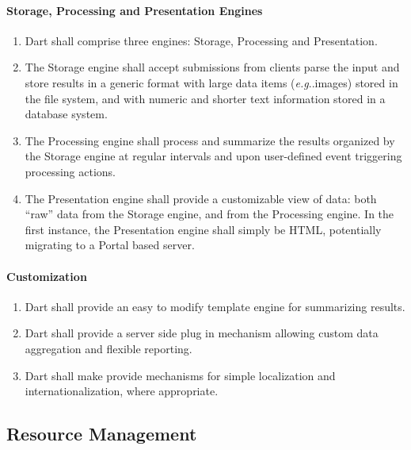 \documentclass{InsightBook}
\makeatletter
\DeclareRobustCommand\onedot{\futurelet\@let@token\@onedot}
\def\@onedot{\ifx\@let@token.\else.\xspace\fi}
\def\eg{\emph{e.g}\onedot} \def\Eg{\emph{E.g}\onedot}
\makeatother
\begin{document}
\paragraph{Storage, Processing and Presentation Engines}
\begin{enumerate}
\item Dart shall comprise three engines: Storage, Processing and
Presentation.
\item The Storage engine shall accept submissions from clients parse
the input and store results in a generic format with large data items
(\eg images)
stored in the file system, and with numeric and
shorter text information stored in a database system.
\item The Processing engine shall process and summarize the results
organized by the Storage engine at regular intervals and upon
user-defined event triggering processing actions.
\item The Presentation engine shall provide a customizable view of
data: both ``raw'' data from the Storage engine, and from the
Processing engine.  In the first instance, the Presentation engine
shall simply be HTML, potentially migrating to a Portal based server.
\end{enumerate}

\paragraph{Customization}
\begin{enumerate}
\item Dart shall provide an easy to modify template engine for
summarizing results.
\item Dart shall provide a server side plug in mechanism allowing
custom data aggregation and flexible reporting.
\item Dart shall make provide mechanisms for simple localization and
internationalization, where appropriate.
\end{enumerate} 


\subsection{Resource Management}
\label{Sec:ResourceManagement}
\end{document}
